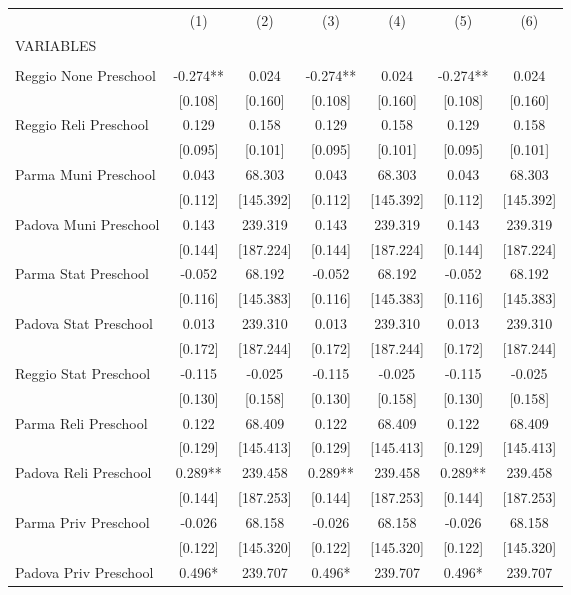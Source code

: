 \begin{tabular}{lcccccc} \hline
 & (1) & (2) & (3) & (4) & (5) & (6) \\
VARIABLES &  &  &  &  &  &  \\ \hline
 &  &  &  &  &  &  \\
Reggio None Preschool & -0.274** & 0.024 & -0.274** & 0.024 & -0.274** & 0.024 \\
 & [0.108] & [0.160] & [0.108] & [0.160] & [0.108] & [0.160] \\
Reggio Reli Preschool & 0.129 & 0.158 & 0.129 & 0.158 & 0.129 & 0.158 \\
 & [0.095] & [0.101] & [0.095] & [0.101] & [0.095] & [0.101] \\
Parma Muni Preschool & 0.043 & 68.303 & 0.043 & 68.303 & 0.043 & 68.303 \\
 & [0.112] & [145.392] & [0.112] & [145.392] & [0.112] & [145.392] \\
Padova Muni Preschool & 0.143 & 239.319 & 0.143 & 239.319 & 0.143 & 239.319 \\
 & [0.144] & [187.224] & [0.144] & [187.224] & [0.144] & [187.224] \\
Parma Stat Preschool & -0.052 & 68.192 & -0.052 & 68.192 & -0.052 & 68.192 \\
 & [0.116] & [145.383] & [0.116] & [145.383] & [0.116] & [145.383] \\
Padova Stat Preschool & 0.013 & 239.310 & 0.013 & 239.310 & 0.013 & 239.310 \\
 & [0.172] & [187.244] & [0.172] & [187.244] & [0.172] & [187.244] \\
Reggio Stat Preschool & -0.115 & -0.025 & -0.115 & -0.025 & -0.115 & -0.025 \\
 & [0.130] & [0.158] & [0.130] & [0.158] & [0.130] & [0.158] \\
Parma Reli Preschool & 0.122 & 68.409 & 0.122 & 68.409 & 0.122 & 68.409 \\
 & [0.129] & [145.413] & [0.129] & [145.413] & [0.129] & [145.413] \\
Padova Reli Preschool & 0.289** & 239.458 & 0.289** & 239.458 & 0.289** & 239.458 \\
 & [0.144] & [187.253] & [0.144] & [187.253] & [0.144] & [187.253] \\
Parma Priv Preschool & -0.026 & 68.158 & -0.026 & 68.158 & -0.026 & 68.158 \\
 & [0.122] & [145.320] & [0.122] & [145.320] & [0.122] & [145.320] \\
Padova Priv Preschool & 0.496* & 239.707 & 0.496* & 239.707 & 0.496* & 239.707 \\

\end{tabular}

